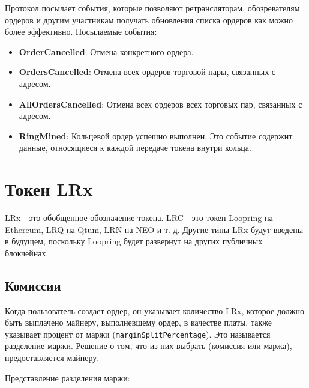 \documentclass[utf8,nofonts]{article}
\makeatletter
\newenvironment{figurehere}
 {\def\@captype{figure}}
 {}
\makeatother
\begin{document}
\begin{multicols}{2}
	Протокол посылает события, которые позволяют ретрансляторам, обозревателям ордеров и другим участникам получать обновления списка ордеров как можно более эффективно. Посылаемые события:
	
	\begin{itemize}
		\item \textbf{OrderCancelled}: Отмена конкретного ордера.
		\item \textbf{OrdersCancelled}: Отмена всех ордеров торговой пары, связанных с адресом.
		\item \textbf{AllOrdersCancelled}: Отмена всех ордеров всех торговых пар, связанных с адресом.
		\item \textbf{RingMined}: Кольцевой ордер успешно выполнен. Это событие содержит данные, относящиеся к каждой передаче токена внутри кольца.
	\end{itemize}
	
	
	\section{Токен LRx\label{sec:token}}
	LRx - это обобщенное обозначение токена. LRC - это токен Loopring на Ethereum, LRQ на Qtum, LRN на NEO и т. д. Другие типы LRx будут введены в будущем, поскольку Loopring будет развернут на других публичных блокчейнах.
	
	\subsection{Комиссии\label{sec:fee_model}} 
	Когда пользователь создает ордер, он указывает количество LRx, которое должно быть выплачено майнеру, выполневшему ордер, в качестве платы, также указывает процент от маржи (\verb|marginSplitPercentage|). Это называется разделение маржи. Решение о том, что из них выбрать (комиссия или маржа), предоставляется майнеру.
	
	Представление разделения маржи:
	
	\begin{center}
		\begin{figurehere}
			\centering
\end{figurehere}
\end{center}
\end{multicols}
\end{document}
